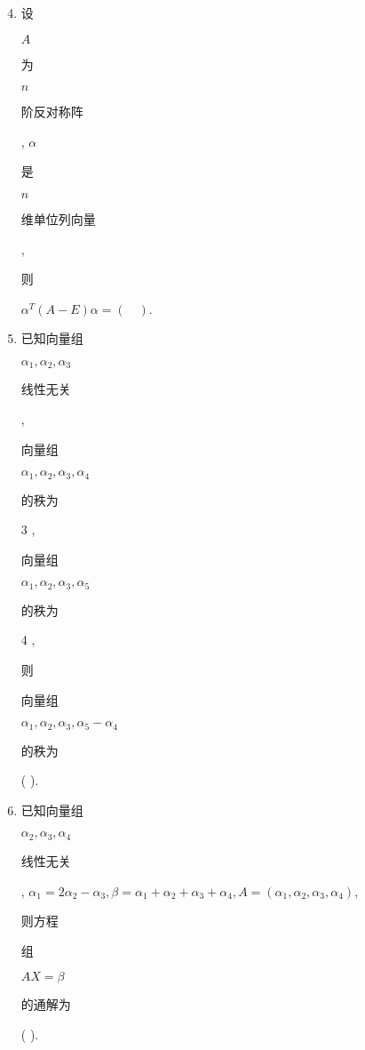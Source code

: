 \documentclass[10pt]{article}
\begin{document}
\begin{enumerate}
  \setcounter{enumi}{3}
  \item \begin{CJK}{UTF8}{mj}设\end{CJK} $A$ \begin{CJK}{UTF8}{mj}为\end{CJK} $n$ \begin{CJK}{UTF8}{mj}阶反对称阵\end{CJK}, $\alpha$ \begin{CJK}{UTF8}{mj}是\end{CJK} $n$ \begin{CJK}{UTF8}{mj}维单位列向量\end{CJK}, \begin{CJK}{UTF8}{mj}则\end{CJK} $\alpha^{T}(A-E) \alpha=(\quad)$.

  \item \begin{CJK}{UTF8}{mj}已知向量组\end{CJK} $\alpha_{1}, \alpha_{2}, \alpha_{3}$ \begin{CJK}{UTF8}{mj}线性无关\end{CJK}, \begin{CJK}{UTF8}{mj}向量组\end{CJK} $\alpha_{1}, \alpha_{2}, \alpha_{3}, \alpha_{4}$ \begin{CJK}{UTF8}{mj}的秩为\end{CJK} 3 , \begin{CJK}{UTF8}{mj}向量组\end{CJK} $\alpha_{1}, \alpha_{2}, \alpha_{3}, \alpha_{5}$ \begin{CJK}{UTF8}{mj}的秩为\end{CJK} 4 , \begin{CJK}{UTF8}{mj}则\end{CJK} \begin{CJK}{UTF8}{mj}向量组\end{CJK} $\alpha_{1}, \alpha_{2}, \alpha_{3}, \alpha_{5}-\alpha_{4}$ \begin{CJK}{UTF8}{mj}的秩为\end{CJK} ( ).

  \item \begin{CJK}{UTF8}{mj}已知向量组\end{CJK} $\alpha_{2}, \alpha_{3}, \alpha_{4}$ \begin{CJK}{UTF8}{mj}线性无关\end{CJK}, $\alpha_{1}=2 \alpha_{2}-\alpha_{3}, \beta=\alpha_{1}+\alpha_{2}+\alpha_{3}+\alpha_{4}, A=\left(\alpha_{1}, \alpha_{2}, \alpha_{3}, \alpha_{4}\right)$, \begin{CJK}{UTF8}{mj}则方程\end{CJK} \begin{CJK}{UTF8}{mj}组\end{CJK} $A X=\beta$ \begin{CJK}{UTF8}{mj}的通解为\end{CJK} ( ).


\end{enumerate}
\end{document}
